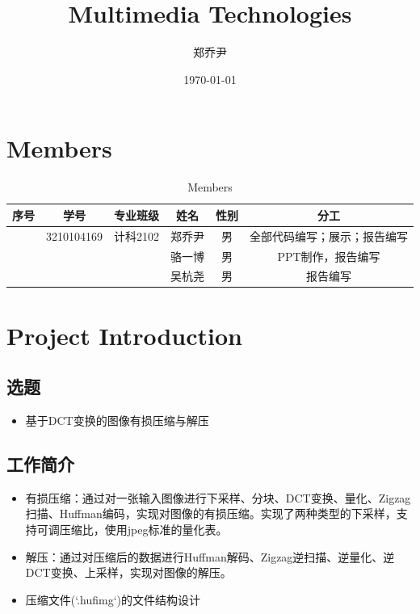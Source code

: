 \documentclass{article}
\title{Multimedia Technologies}
\author{郑乔尹}
\date{\today}
\begin{document}
\doublespacing %
\maketitle

\section{Members}

\begin{table}[htbp]
    \centering
    \begin{tabular}{|c|c|c|c|c|c|}
        \hline
        序号 & 学号 & 专业班级 & 姓名 & 性别 & 分工 \\
        \hline
        & 3210104169 & 计科2102 & 郑乔尹 & 男 & 全部代码编写；展示；报告编写 \\
        \hline
        & & & 骆一博 & 男 & PPT制作，报告编写 \\
        \hline
        & & & 吴杭尧 & 男 & 报告编写 \\
        \hline
    \end{tabular}
    \caption{Members}
\end{table}


\section{Project Introduction}

\subsection{选题}

\begin{itemize}
    \item 基于DCT变换的图像有损压缩与解压
\end{itemize}

\subsection{工作简介}

\begin{itemize}
    \item 有损压缩：通过对一张输入图像进行下采样、分块、DCT变换、量化、Zigzag扫描、Huffman编码，实现对图像的有损压缩。实现了两种类型的下采样，支持可调压缩比，使用jpeg标准的量化表。
    \item 解压：通过对压缩后的数据进行Huffman解码、Zigzag逆扫描、逆量化、逆DCT变换、上采样，实现对图像的解压。
    \item 压缩文件(`.hufimg`)的文件结构设计
\end{itemize}
\end{document}
